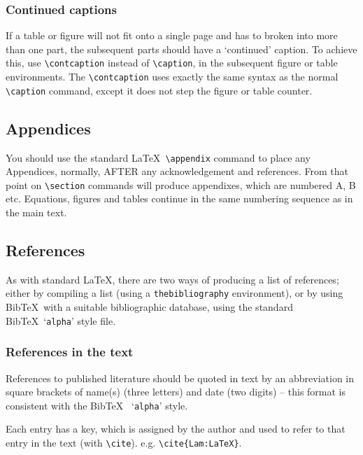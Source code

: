 \documentclass{fac}
\begin{document}
\subsubsection{Continued captions}

If a table or figure will not fit onto a single page and has to broken into
more than one part, the subsequent parts should have a `continued' caption.
To achieve this, use \verb"\contcaption" instead of \verb"\caption", in the
subsequent figure or table environments. The \verb"\contcaption" uses exactly
the same syntax as the normal \verb"\caption" command, except it does not step
the figure or table counter.

\subsection{Appendices}

You should use the standard \LaTeX\ \verb"\appendix" command to place any
Appendices, normally, AFTER any acknowledgement and references.
From that point on \verb"\section" commands will produce appendixes, which are
numbered A, B etc. Equations, figures and tables continue in the same
numbering sequence as in the main text.

\subsection{References}

As with standard \LaTeX, there are two ways of producing a list of
references; either by compiling a list (using a \verb"thebibliography"
environment), or by using Bib\TeX\ with a suitable bibliographic database,
using the standard Bib\TeX\ `\verb"alpha"' style file.

\subsubsection{References in the text}

References to published literature should be quoted in text by an
abbreviation in square brackets of name(s) (three letters) and date
(two digits) -- this format is consistent with the Bib\TeX\ %
`\verb"alpha"' style.

Each entry has a key, which is assigned by the author
and used to refer to that entry in the text (with \verb"\cite").
e.g. \verb"\cite{Lam:LaTeX}".
\end{document}
